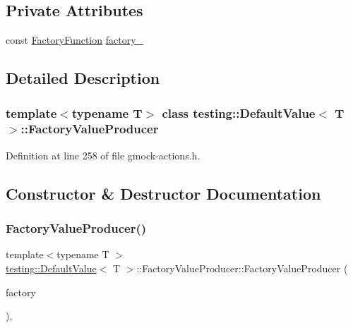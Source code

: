 \subsection*{Private Attributes}
\begin{DoxyCompactItemize}
\item 
const \hyperlink{classtesting_1_1DefaultValue_a5763a68d75e0a4c97fcaff708e2df803}{Factory\+Function} \hyperlink{classtesting_1_1DefaultValue_1_1FactoryValueProducer_ab3a016297d3a8fd3c2849c5a4d202d9b}{factory\+\_\+}
\end{DoxyCompactItemize}


\subsection{Detailed Description}
\subsubsection*{template$<$typename T$>$\newline
class testing\+::\+Default\+Value$<$ T $>$\+::\+Factory\+Value\+Producer}



Definition at line 258 of file gmock-\/actions.\+h.



\subsection{Constructor \& Destructor Documentation}
\mbox{\label{classtesting_1_1DefaultValue_1_1FactoryValueProducer_adc9253b20288be937687b3cefa7ef476}} 
\subsubsection{\texorpdfstring{Factory\+Value\+Producer()}{FactoryValueProducer()}}
{\footnotesize\ttfamily template$<$typename T $>$ \\
\hyperlink{classtesting_1_1DefaultValue}{testing\+::\+Default\+Value}$<$ T $>$\+::Factory\+Value\+Producer\+::\+Factory\+Value\+Producer (\begin{DoxyParamCaption}\item[{\hyperlink{classtesting_1_1DefaultValue_a5763a68d75e0a4c97fcaff708e2df803}{Factory\+Function}}]{factory }\end{DoxyParamCaption})\hspace{0.3cm}{\ttfamily [inline]}, {\ttfamily [explicit]}}



